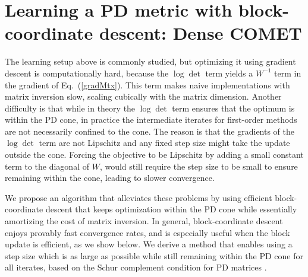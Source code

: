 \documentclass[twoside,11pt]{article}
\newcommand\mat[1]{{#1}}
\newcommand{\W}{\mat{W}}
\newcommand{\newW}{{\mat{W^{new}}}}
\renewcommand{\eqref}[1]{Eq.~(\ref{#1})}
\begin{document}
\section{Learning a PD metric with block-coordinate descent: Dense COMET}
\label{learing_dense_comet}
\vskip -5pt
The learning setup above is commonly studied, but 
optimizing it using gradient descent is computationally hard, because the $\log \det$ term yields a $\W^{-1}$ term in the gradient of \eqref{gradMtx}. This term makes naive implementations with matrix inversion slow, scaling cubically with the matrix dimension. Another difficulty is that while in theory the $\log \det$ term ensures that the optimum is within the PD cone, in practice the intermediate iterates for first-order methods are not necessarily confined to the cone. The reason is that the gradients of the $\log \det$ term are not Lipschitz and any fixed step size might take the update outside the cone. Forcing the objective to be Lipschitz by adding a small constant term to the diagonal of $\W$, would still require the step size to be small to ensure remaining within the cone, leading to slower convergence. 

We propose an algorithm that alleviates these problems by using efficient block-coordinate descent that keeps optimization within the PD cone while essentially amortizing the cost of matrix inversion.
In general, block-coordinate descent enjoys provably fast convergence rates, and is especially useful when the block update is efficient, as we show below. We derive a method that enables using a step size which is as large as possible while still remaining within the PD cone for all iterates, based on the Schur complement condition for PD matrices \citep[p. 650]{boyd2004convex}.

\end{document}
